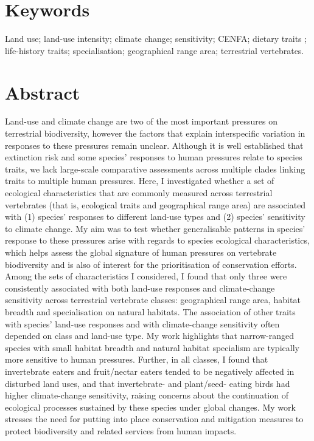 
\section*{Keywords}
Land use; land-use intensity; climate change; sensitivity; CENFA; dietary traits ; life-history traits; specialisation; geographical range area; terrestrial vertebrates.

\section*{Abstract}
Land-use and climate change are two of the most important pressures on terrestrial biodiversity, however the factors that explain interspecific variation in responses to these pressures remain unclear. Although it is well established that extinction risk and some species' responses to human pressures relate to species traits, we lack large-scale comparative assessments across multiple clades linking traits to multiple human pressures. Here, I investigated whether a set of ecological characteristics that are commonly measured across terrestrial vertebrates (that is, ecological traits and geographical range area) are associated with (1) species' responses to different land-use types and (2) species' sensitivity to climate change. My aim was to test whether generalisable patterns in species' response to these pressures arise with regards to species ecological characteristics, which helps assess the global signature of human pressures on vertebrate biodiversity and is also of interest for the prioritisation of conservation efforts. Among the sets of characteristics I considered, I found that only three were consistently associated with both land-use responses and climate-change sensitivity across terrestrial vertebrate classes: geographical range area, habitat breadth and specialisation on natural habitats. The association  of other traits with species' land-use responses and with climate-change sensitivity often depended on class and land-use type. My work highlights that narrow-ranged species with small habitat breadth and natural habitat specialism are typically more sensitive to human pressures. Further, in all classes, I found that invertebrate eaters and fruit/nectar eaters tended to be negatively affected in disturbed land uses, and that invertebrate- and plant/seed- eating birds had higher climate-change sensitivity, raising concerns about the continuation of ecological processes sustained by these species under global changes. My work stresses the need for putting into place conservation and mitigation measures to protect biodiversity and related services from human impacts.  

